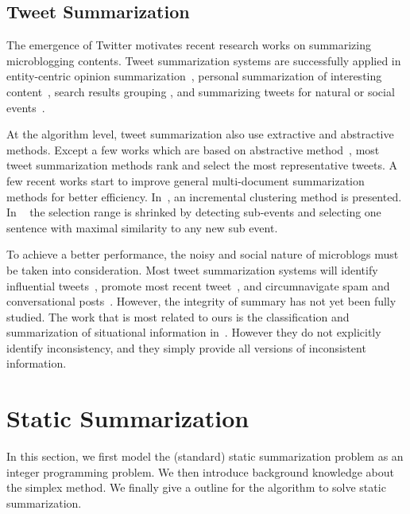 \documentclass{llncs}
\begin{document}
\subsection{Tweet Summarization}
The emergence of Twitter motivates recent research works on summarizing microblogging contents. Tweet summarization systems are successfully applied in entity-centric opinion summarization~\cite{Meng2012Entitycentric}, personal summarization of interesting content~\cite{Ren2013Personalized,Chin2017TOTEM}, search results grouping \cite{Mathioudakis2010TwitterMonitor}, and summarizing tweets for natural or social events~\cite{Takamura2011Summarizing,Lin2012Generating,Rudra2015Extracting,Shou2013Sumblr,Liu2016LEDS,Gillani2017Post,Zubiaga2012Towards}.

At the algorithm level, tweet summarization also use extractive and abstractive methods. Except a few works which are based on abstractive method~\cite{Sharifi2010Summarizing}, most tweet summarization methods rank and select the most representative tweets. A few recent works start to improve general multi-document summarization methods for better efficiency. In~\cite{Shou2013Sumblr}, an incremental clustering method is presented. In ~\cite{Zubiaga2012Towards} the selection range is shrinked by detecting sub-events and selecting one sentence with maximal similarity to any new sub event.

To achieve a better performance, the noisy and social nature of microblogs must be taken into consideration. Most tweet summarization systems will identify influential tweets~\cite{Hannon2010Recommending},  promote most recent tweet~\cite{Efron2011Estimation}, and circumnavigate spam and conversational posts~\cite{Gillani2017Post}. However, the integrity of summary has not yet been fully studied. The work that is most related to ours is the 
classification and summarization of situational information in~\cite{Rudra2015Extracting,Rudra2016Summarizing}. However they do not explicitly identify inconsistency, and they simply provide all versions of inconsistent information.


\section{Static Summarization}\label{sec:static}
In this section, we first model the (standard) static summarization problem as an integer programming problem. We then introduce background knowledge about the simplex method. We finally give a outline for the algorithm to solve static summarization.
\end{document}

